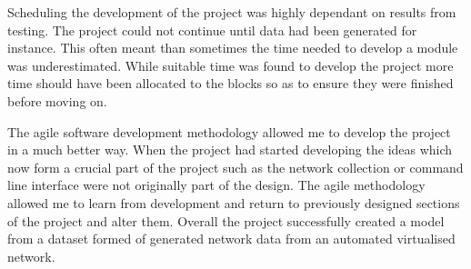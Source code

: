 Scheduling the development of the project was highly dependant on results from testing. The project could not continue until data had been generated for instance. This often meant than sometimes the time needed to develop a module was underestimated. While suitable time was found to develop the project more time should have been allocated to the blocks so as to ensure they were finished before moving on.

The agile software development methodology allowed me to develop the project in a much better way. When the project had started developing the ideas which now form a crucial part of the project such as the network collection or command line interface were not originally part of the design. The agile methodology allowed me to learn from development and return to previously designed sections of the project and alter them. Overall the project successfully created a model from a dataset formed of generated network data from an automated virtualised network.



